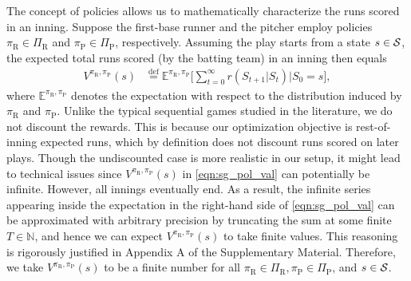 \documentclass[aoas]{imsart}
\newcommand{\defeq}{\stackrel{\text{def}}{=}}
\begin{document}
    The concept of policies allows us to mathematically characterize the runs scored in an inning. Suppose the first-base runner and the pitcher employ policies $\pi_\text{R} \in \Pi_\text{R}$ and $\pi_\text{P} \in \Pi_\text{P}$, respectively. Assuming the play starts from a state $s \in {\cal S}$, the expected total runs scored (by the batting team) in an inning then equals 
    \begin{align}
       \label{eqn:sg_pol_val}
       V^{\pi_\text{R},\pi_\text{P}}(s) &\defeq \mathbb{E}^{\pi_\text{R},\pi_\text{P}}\Bigg[\sum_{t=0}^\infty r(S_{t+1}|S_t) \Big| S_0 = s\Bigg], 
    \end{align}
    where $\mathbb{E}^{\pi_\text{R},\pi_\text{P}}$ denotes the expectation with respect to the distribution induced by $\pi_\text{R}$ and $\pi_{\text{P}}$. Unlike the typical sequential games studied in the literature, we do not discount the rewards. This is because our optimization objective is rest-of-inning expected runs, which by definition does not discount runs scored on later plays. Though the undiscounted case is more realistic in our setup, it might lead to technical issues since $V^{\pi_\text{R},\pi_\text{P}}(s)$ in \eqref{eqn:sg_pol_val} can potentially be infinite. However, all innings eventually end. As a result, the infinite series appearing inside the expectation in the right-hand side of \eqref{eqn:sg_pol_val} can be approximated with arbitrary precision by truncating the sum at some finite $T \in \mathbb{N}$, and hence we can expect $V^{\pi_\text{R},\pi_\text{P}}(s)$ to take finite values. This reasoning is rigorously justified in Appendix A of the Supplementary Material. Therefore, we take $V^{\pi_\text{R},\pi_\text{P}}(s)$ to be a finite number for all $\pi_\text{R} \in \Pi_\text{R}, \pi_\text{P} \in \Pi_\text{P}$, and $s \in {\cal S}$. 
   
\end{document}
